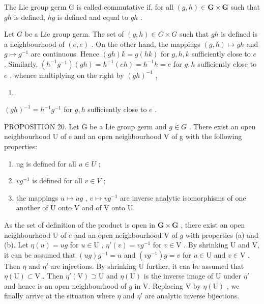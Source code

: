 The Lie group germ G is called commutative if, for all \((g,h)\in \mathbf{G}\times \mathbf{G}\) such that \(gh\) is defined, \(hg\) is defined and equal to \(gh\) .

Let \(G\) be a Lie group germ. The set of \((g, h) \in G \times G\) such that \(gh\) is defined is a neighbourhood of \((e, e)\) . On the other hand, the mappings \((g, h) \mapsto gh\) and \(g \mapsto g^{-1}\) are continuous. Hence \((gh)k = g(hk)\) for \(g, h, k\) sufficiently close to \(e\) . Similarly, \((h^{-1}g^{-1})(gh) = h^{-1}(eh) = h^{-1}h = e\) for \(g, h\) sufficiently close to \(e\) , whence multiplying on the right by \((gh)^{-1}\) ,

\begin{enumerate}
\def\labelenumi{(\arabic{enumi})}
\setcounter{enumi}{9}
\tightlist
\item
\end{enumerate}

\((gh)^{-1} = h^{-1}g^{-1}\) for \(g,h\) sufficiently close to \(e\) .

PROPOSITION 20. Let G be a Lie group germ and \(g \in G\) . There exist an open neighbourhood U of e and an open neighbourhood V of g with the following properties:

\begin{enumerate}
\def\labelenumi{(\alph{enumi})}
\item
  ug is defined for all \(u \in U\) ;
\item
  \(vg^{-1}\) is defined for all \(v \in V\) ;
\item
  the mappings \(u \mapsto ug\) , \(v \mapsto vg^{-1}\) are inverse analytic isomorphisms of one another of U onto V and of V onto U.
\end{enumerate}

As the set of definition of the product is open in \(\mathbf{G} \times \mathbf{G}\) , there exist an open neighbourhood U of \(e\) and an open neighbourhood V of \(g\) with properties (a) and (b). Let \(\eta(u) = ug\) for \(u \in \mathrm{U}\) , \(\eta'(v) = vg^{-1}\) for \(v \in \mathrm{V}\) . By shrinking U and V, it can be assumed that \((ug)g^{-1} = u\) and \((vg^{-1})g = v\) for \(u \in \mathrm{U}\) and \(v \in \mathrm{V}\) . Then \(\eta\) and \(\eta'\) are injections. By shrinking U further, it can be assumed that \(\eta(\mathrm{U}) \subset \mathrm{V}\) . Then \(\eta'(\mathrm{V}) \supset \mathrm{U}\) and \(\eta(\mathrm{U})\) is the inverse image of U under \(\eta'\) and hence is an open neighbourhood of \(g\) in V. Replacing V by \(\eta(\mathrm{U})\) , we finally arrive at the situation where \(\eta\) and \(\eta'\) are analytic inverse bijections.

